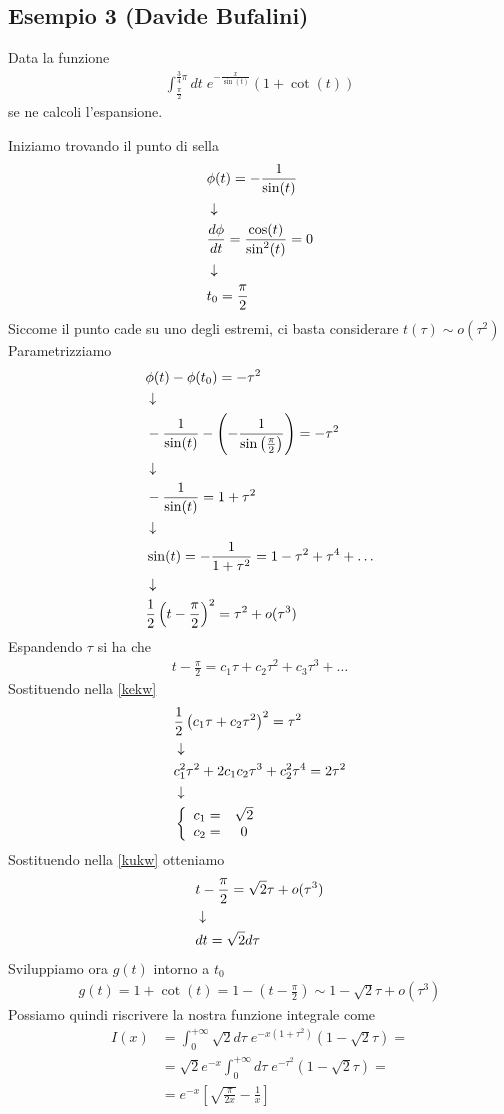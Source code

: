 \newpage

\subsection{Esempio 3 (Davide Bufalini)}

Data la funzione
\begin{align}
	\int_{\frac{\pi}{2}}^{\frac{3}{4}\pi} dt \; e^{-\frac{x}{\sin(t)}} (1 + \cot (t))
\end{align}
se ne calcoli l'espansione.

Iniziamo trovando il punto di sella
\begin{align}
	&\phi(t) = -\frac{1}{\sin(t)}\\ &\downarrow \nonumber \\
	&\frac{d\phi}{dt} = \frac{\cos (t)}{\sin^2 (t)} = 0 \\ &\downarrow \nonumber \\
	& t_0 = \frac{\pi}{2}
\end{align}
Siccome il punto cade su uno degli estremi, ci basta considerare $t(\tau) \sim o(\tau^2)$
Parametrizziamo
\begin{align}
	&\phi(t) - \phi(t_0) = -\tau^2\\ &\downarrow \nonumber \\
	&-\frac{1}{\sin (t)}-\left(-\frac{1}{\sin \left( \frac{\pi}{2}\right)}\right) = -\tau^2 \nonumber \\ &\downarrow \nonumber \\
	&-\frac{1}{\sin (t)} = 1 +\tau^2\nonumber \\ &\downarrow \nonumber \\
	&\sin (t) = -\frac{1}{1+\tau^2} = 1 - \tau^2 + \tau^4 + \dots \nonumber \\ &\downarrow \nonumber \\
	&\frac{1}{2} \left( t -\frac{\pi}{2} \right)^2 = \tau^2 + o(\tau^3) \label{kekw}
\end{align}
Espandendo $\tau$ si ha che
\begin{align}
	 t -\frac{\pi}{2} = c_1 \tau + c_2 \tau^2 + c_3 \tau^3 + \dots \label{kukw}
\end{align}
Sostituendo nella \ref{kekw}
\begin{align}
&\frac{1}{2} \left( c_1 \tau + c_2 \tau^2 \right)^2 = \tau^2 \\ &\downarrow \nonumber \\
&c_1^2 \tau^2 + 2c_1 c_2 \tau^3 + c_2^2 \tau^4 = 2 \tau^2\nonumber \\ &\downarrow \nonumber \\
&\left\{ \begin{array}{cc} c_1 = &\sqrt{2}\\ c_2 = &0 \end{array} \right.
\end{align}
Sostituendo nella \ref{kukw} otteniamo
\begin{align}
	&t -\frac{\pi}{2} = \sqrt{2}\tau + o(\tau^3)	\\ &\downarrow \nonumber \\
	&dt = \sqrt{2}d\tau
\end{align}
Sviluppiamo ora $g(t)$ intorno a $t_0$
\begin{align}
	g(t) = 1 + \cot(t) = 1 - \left( t -\frac{\pi}{2} \right) \sim 1 - \sqrt{2}\tau +o(\tau^3)
\end{align}
Possiamo quindi riscrivere la nostra funzione integrale come
\begin{align}
	I(x) &= \int_{0}^{+\infty} \sqrt{2} d\tau \; e^{-x(1+\tau^2)}(1 - \sqrt{2}\tau) = \nonumber\\
	&= \sqrt{2}e^{-x} \int_{0}^{+\infty}  d\tau \; e^{-\tau^2}(1 - \sqrt{2}\tau) = \nonumber\\
	&=e^{-x} \left[ \sqrt{\frac{\pi}{2x}} - \frac{1}{x} \right]
\end{align}


